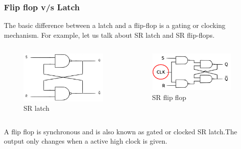 \documentclass{beamer}
\begin{document}
\begin{frame}
\frametitle{Flip flop v/s Latch}

The basic difference between a latch and a flip-flop is a gating or clocking mechanism. For example, let us talk about SR latch and SR flip-flops.
\begin{columns}
\begin{figure}[h]
    \includegraphics[scale=.033]{srl.png}
    \caption{SR latch}
\end{figure}

 
\begin{figure}[h]
    \includegraphics[scale=.033]{srffc.png}
    \caption{SR flip flop}
\end{figure}
\end{columns}
A flip flop is synchronous and is also known as gated or clocked SR latch.The output only changes when a active high clock is given.
\end{frame}
\end{document}
